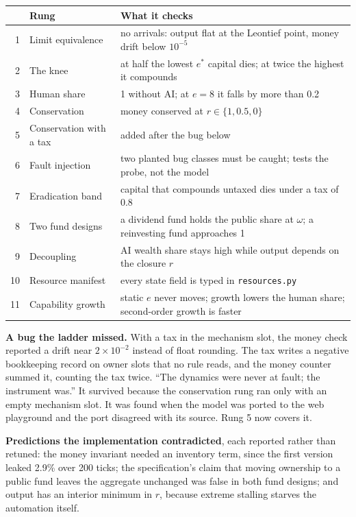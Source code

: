 \documentclass[11pt]{article}
\newcommand{\code}[1]{\texttt{#1}}
\begin{document}
\begin{center}
\begin{tabular}{@{}rp{3.6cm}p{9.6cm}@{}}
\toprule
& \textbf{Rung} & \textbf{What it checks} \\
\midrule
1 & Limit equivalence & no arrivals: output flat at the Leontief point, money drift below $10^{-5}$ \\
2 & The knee & at half the lowest $e^*$ capital dies; at twice the highest it compounds \\
3 & Human share & 1 without AI; at $e=8$ it falls by more than 0.2 \\
4 & Conservation & money conserved at $r \in \{1, 0.5, 0\}$ \\
5 & Conservation with a tax & added after the bug below \\
6 & Fault injection & two planted bug classes must be caught; tests the probe, not the model \\
7 & Eradication band & capital that compounds untaxed dies under a tax of 0.8 \\
8 & Two fund designs & a dividend fund holds the public share at $\omega$; a reinvesting fund approaches 1 \\
9 & Decoupling & AI wealth share stays high while output depends on the closure $r$ \\
10 & Resource manifest & every state field is typed in \code{resources.py} \\
11 & Capability growth & static $e$ never moves; growth lowers the human share; second-order growth is faster \\
\bottomrule
\end{tabular}
\end{center}

\noindent \textbf{A bug the ladder missed.} With a tax in the mechanism slot, the money
check reported a drift near $2\times10^{-2}$ instead of float rounding. The tax writes a
negative bookkeeping record on owner slots that no rule reads, and the money counter
summed it, counting the tax twice. ``The dynamics were never at fault; the instrument
was.'' It survived because the conservation rung ran only with an empty mechanism slot.
It was found when the model was ported to the web playground and the port disagreed
with its source. Rung 5 now covers it.

\textbf{Predictions the implementation contradicted}, each reported rather than
retuned: the money invariant needed an inventory term, since the first version leaked
2.9\% over 200 ticks; the specification's claim that moving ownership to a public fund
leaves the aggregate unchanged was false in both fund designs; and output has an
interior minimum in $r$, because extreme stalling starves the automation itself.
\end{document}

